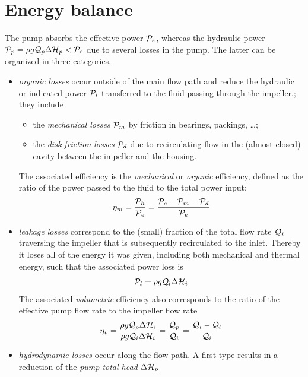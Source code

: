 \section{Energy balance}
\label{sec:pumps:energy}

The pump absorbs the effective power $\mathcal P_e$, whereas the hydraulic
power $\mathcal P_p = \rho g \mathcal Q_p \Delta \mathcal H_p < \mathcal P_e$ due to
several losses in the pump. The latter can be organized in three
categories.
\begin{itemize}
\item \emph{organic losses} occur outside of the main flow path and
  reduce the hydraulic or indicated power $\mathcal P_i$ transferred to
  the fluid passing through the impeller.; they include
  \begin{itemize}
  \item the \emph{mechanical losses} $\mathcal P_m$ by friction in
    bearings, packings, \ldots;
  \item the \emph{disk friction losses} $\mathcal P_d$ due to
    recirculating flow in the (almost closed) cavity between the
    impeller and the housing.
  \end{itemize}
  The associated efficiency is the \emph{mechanical} or \emph{organic}
  efficiency, defined as the ratio of the power passed to the fluid to
  the total power input:
  \begin{align*}
    \eta_m 
    = \frac{\mathcal P_h}{\mathcal P_e} 
    = \frac{\mathcal P_e - \mathcal P_m - \mathcal P_d}{\mathcal P_e}
  \end{align*}
\item \emph{leakage losses} correspond to the (small) fraction of the
  total flow rate $\mathcal Q_i$ traversing the impeller that is
  subsequently recirculated to the inlet. Thereby it loses all of the
  energy it was given, including both mechanical and thermal energy,
  such that the associated power loss is
  \begin{align*}
    \mathcal P_l = \rho g \mathcal Q_l \Delta \mathcal H_i 
  \end{align*}
  The associated \emph{volumetric} efficiency also corresponds to the
  ratio of the effective pump flow rate to the impeller flow rate
  \begin{align*}
    \eta_v 
    = \frac{\rho g \mathcal Q_p \Delta \mathcal H_i}{\rho g \mathcal Q_i \Delta \mathcal H_i} 
    = \frac{\mathcal Q_p}{\mathcal Q_i} = \frac{\mathcal Q_i - \mathcal Q_l}{\mathcal Q_i}
  \end{align*}
\item \emph{hydrodynamic losses} occur along the flow path. A first
  type results in a reduction of the \emph{pump total head} $\Delta \mathcal H_p$

\end{itemize}
